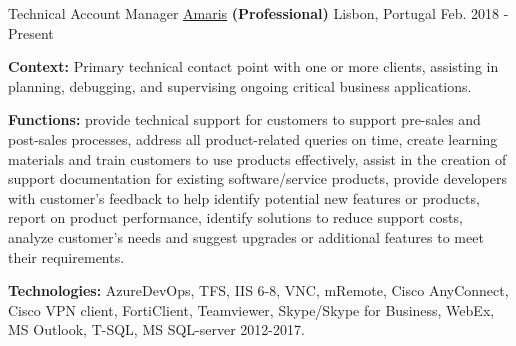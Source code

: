 \begin{cventries}


  \cventry
    {Technical Account Manager} %
    {\href{https://www.amaris.com/}{Amaris} \textbf{(Professional)}} %
    {Lisbon, Portugal} %
    {Feb. 2018 - Present} %
    {
      \begin{cvitems} %
		\item {\textbf{Context:} Primary technical contact point with one or more clients, assisting in planning, debugging, and supervising ongoing critical business applications.}
		\item {\textbf{Functions:} provide technical support for customers to support pre-sales and post-sales processes, address all product-related queries on time, create learning materials and train customers to use products effectively, assist in the creation of support documentation for existing software/service products, provide developers with customer's feedback to help identify potential new features or products, report on product performance, identify solutions to reduce support costs, analyze customer's needs and suggest upgrades or additional features to meet their requirements.}		
		\item {\textbf{Technologies:} AzureDevOps, TFS, IIS 6-8, VNC, mRemote, Cisco AnyConnect, Cisco VPN client, FortiClient, Teamviewer, Skype/Skype for Business, WebEx, MS Outlook, T-SQL, MS SQL-server 2012-2017.}
      \end{cvitems}
    } 
    

\end{cventries}
